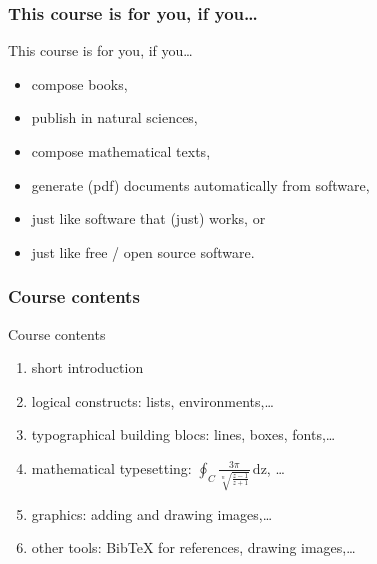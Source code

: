 \documentclass[13pt]{beamer}
\begin{document}
\begin{frame}\frametitle{This course is for you, if you\ldots}

This course is for you, if you\ldots
\begin{itemize}
  \item compose books,
  \item publish in natural sciences,
  \item compose mathematical texts,
  \item generate (pdf) documents automatically from software,
  \item just like software that (just) works, or
  \item just like free / open source software.
\end{itemize}
\end{frame}


\begin{frame}\frametitle{Course contents}

Course contents
\begin{enumerate}
  \item short introduction
  \item logical constructs: lists, environments,\dots
  \item typographical building blocs: lines, boxes, fonts,\ldots
  \item mathematical typesetting: 
  $\displaystyle\oint_C \frac{3\pi}{\sqrt[n]{\frac{z-1}{z+1}}}\, \mathrm{dz}$,
  \dots
  \item graphics: adding and drawing images,\dots
  \item other tools: BibTeX for references, drawing images,\dots
\end{enumerate}
\end{frame}
\end{document}
